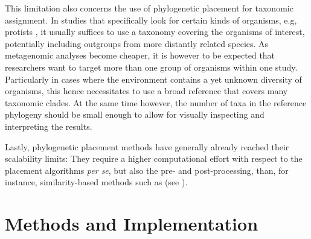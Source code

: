This limitation also concerns the use of phylogenetic placement for taxonomic assignment.
In studies that specifically look for certain kinds of organisms, e.g, protists \cite{Mahe2017},
it usually suffices to use a taxonomy covering the organisms of interest,
potentially including outgroups from more distantly related species.
As metagenomic analyses become cheaper,
it is however to be expected that researchers want to target more than one group of organisms within one study.
Particularly in cases where the environment contains a yet unknown diversity of organisms,
this hence necessitates to use a broad reference that covers many taxonomic clades.
At the same time however, the number of taxa in the reference phylogeny
should be small enough to allow for visually inspecting and interpreting the results.

Lastly, phylogenetic placement methods have generally already reached their scalability limits:
They require a higher computational effort with respect to the placement algorithms \emph{per se},
but also the pre- and post-processing, than, for instance, similarity-based methods such as 
(see ).



\section{Methods and Implementation}
\label{ch:AutomaticTrees:sec:Methods}


